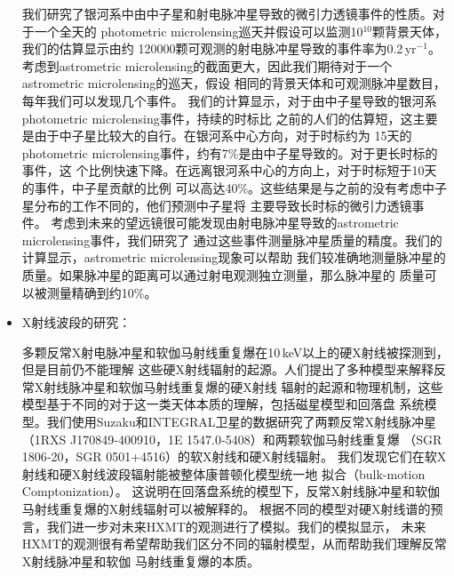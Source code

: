 \begin{itemize}
我们研究了银河系中由中子星和射电脉冲星导致的微引力透镜事件的性质。对于一个全天的
photometric microlensing巡天并假设可以监测10$^{10}$颗背景天体，我们的估算显示由约
120000颗可观测的射电脉冲星导致的事件率为0.2\,yr$^{-1}$。考虑到astrometric 
microlensing的截面更大，因此我们期待对于一个astrometric microlensing的巡天，假设
相同的背景天体和可观测脉冲星数目，每年我们可以发现几个事件。
%
我们的计算显示，对于由中子星导致的银河系photometric microlensing事件，持续的时标比
之前的人们的估算短，这主要是由于中子星比较大的自行。在银河系中心方向，对于时标约为
15天的photometric microlensing事件，约有7\%是由中子星导致的。对于更长时标的事件，这
个比例快速下降。在远离银河系中心的方向上，对于时标短于10天的事件，中子星贡献的比例
可以高达40\%。这些结果是与之前的没有考虑中子星分布的工作不同的，他们预测中子星将
主要导致长时标的微引力透镜事件。
%
考虑到未来的望远镜很可能发现由射电脉冲星导致的astrometric microlensing事件，我们研究了
通过这些事件测量脉冲星质量的精度。我们的计算显示，astrometric microlensing现象可以帮助
我们较准确地测量脉冲星的质量。如果脉冲星的距离可以通过射电观测独立测量，那么脉冲星的
质量可以被测量精确到约10\%。

\item X射线波段的研究：

多颗反常X射电脉冲星和软伽马射线重复爆在10\,keV以上的硬X射线被探测到，但是目前仍不能理解
这些硬X射线辐射的起源。人们提出了多种模型来解释反常X射线脉冲星和软伽马射线重复爆的硬X射线
辐射的起源和物理机制，这些模型基于不同的对于这一类天体本质的理解，包括磁星模型和回落盘
系统模型。我们使用Suzaku和INTEGRAL卫星的数据研究了两颗反常X射线脉冲星
（1RXS J170849‑400910，1E 1547.0‑5408）和两颗软伽马射线重复爆
（SGR 1806‑20，SGR 0501+4516）的软X射线和硬X射线辐射。
我们发现它们在软X射线和硬X射线波段辐射能被整体康普顿化模型统一地
拟合（bulk-motion Comptonization）。
这说明在回落盘系统的模型下，反常X射线脉冲星和软伽马射线重复爆的X射线辐射可以被解释的。
根据不同的模型对硬X射线谱的预言，我们进一步对未来HXMT的观测进行了模拟。我们的模拟显示，
未来HXMT的观测很有希望帮助我们区分不同的辐射模型，从而帮助我们理解反常X射线脉冲星和软伽
马射线重复爆的本质。

\end{itemize}
\pkuthssffaq

